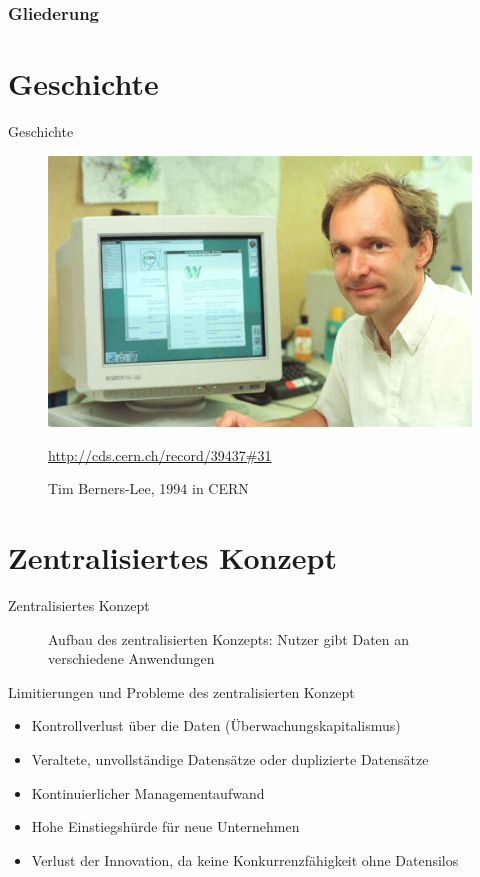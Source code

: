 \documentclass{beamer}              %
\begin{document}
\begin{frame}	
	\frametitle{Gliederung}
	\tableofcontents
\end{frame}

\section{Geschichte}
\begin{frame}{Geschichte}
\begin{figure}[htbp]
    \centering
    \includegraphics[width=0.70\paperwidth]{images/berners-lee.jpg}
    \caption{Tim Berners-Lee, 1994 in CERN}
    \url{http://cds.cern.ch/record/39437\#31}
\end{figure}
\end{frame}

\section{Zentralisiertes Konzept}
\begin{frame}{Zentralisiertes Konzept}
\begin{figure}[htbp]
\centering

 \caption{Aufbau des zentralisierten Konzepts: Nutzer gibt Daten an verschiedene Anwendungen}
 \end{figure}
\end{frame}
\begin{frame}{Limitierungen und Probleme des zentralisierten Konzept}
\begin{itemize}
    \item Kontrollverlust über die Daten (Überwachungskapitalismus) \cite{zuboff2018ueberwachungskapitalismus}
    \item Veraltete, unvollständige Datensätze oder duplizierte Datensätze 
    \item Kontinuierlicher Managementaufwand
    \item Hohe Einstiegshürde für neue Unternehmen
    \item Verlust der Innovation, da keine Konkurrenzfähigkeit ohne Datensilos
\end{itemize}
\end{frame}
\end{document}
